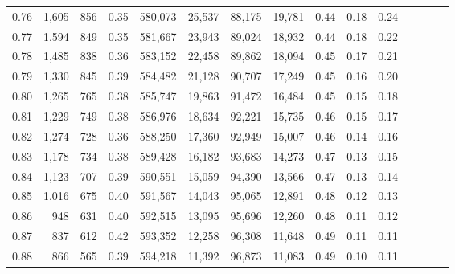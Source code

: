 \begin{tabular}{rrrcrrrrrrrrrrr}
0.76 &   1,605 &    856 &                                       0.35 &  580,073 &   25,537 &   88,175 &   19,781 &  0.44 &  0.18 &                         0.24 \\
0.77 &   1,594 &    849 &                                       0.35 &  581,667 &   23,943 &   89,024 &   18,932 &  0.44 &  0.18 &                         0.22 \\
0.78 &   1,485 &    838 &                                       0.36 &  583,152 &   22,458 &   89,862 &   18,094 &  0.45 &  0.17 &                         0.21 \\
0.79 &   1,330 &    845 &                                       0.39 &  584,482 &   21,128 &   90,707 &   17,249 &  0.45 &  0.16 &                         0.20 \\
0.80 &   1,265 &    765 &                                       0.38 &  585,747 &   19,863 &   91,472 &   16,484 &  0.45 &  0.15 &                         0.18 \\
0.81 &   1,229 &    749 &                                       0.38 &  586,976 &   18,634 &   92,221 &   15,735 &  0.46 &  0.15 &                         0.17 \\
0.82 &   1,274 &    728 &                                       0.36 &  588,250 &   17,360 &   92,949 &   15,007 &  0.46 &  0.14 &                         0.16 \\
0.83 &   1,178 &    734 &                                       0.38 &  589,428 &   16,182 &   93,683 &   14,273 &  0.47 &  0.13 &                         0.15 \\
0.84 &   1,123 &    707 &                                       0.39 &  590,551 &   15,059 &   94,390 &   13,566 &  0.47 &  0.13 &                         0.14 \\
0.85 &   1,016 &    675 &                                       0.40 &  591,567 &   14,043 &   95,065 &   12,891 &  0.48 &  0.12 &                         0.13 \\
0.86 &     948 &    631 &                                       0.40 &  592,515 &   13,095 &   95,696 &   12,260 &  0.48 &  0.11 &                         0.12 \\
0.87 &     837 &    612 &                                       0.42 &  593,352 &   12,258 &   96,308 &   11,648 &  0.49 &  0.11 &                         0.11 \\
0.88 &     866 &    565 &                                       0.39 &  594,218 &   11,392 &   96,873 &   11,083 &  0.49 &  0.10 &                         0.11 \\

\end{tabular}
